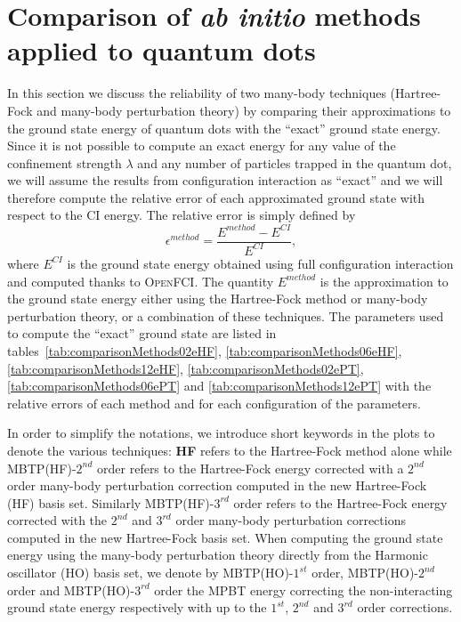 \section{Comparison of \textit{ab initio} methods applied to quantum dots}
\label{sec:compTechniquesSection}
In this section we discuss the reliability of two many-body techniques (Hartree-Fock and many-body perturbation theory) by comparing their approximations to the ground state energy of quantum dots with the ``exact'' ground state energy. Since it is not possible to compute an exact energy for any value of the confinement strength $\lambda$ and any number of particles trapped in the quantum dot, we will assume the results from configuration interaction as ``exact'' and we will therefore compute the relative error of each approximated ground state with respect to the CI energy. The relative error is simply defined by
\begin{equation}
 \epsilon^{method}=\frac{E^{method}-E^{CI}}{E^{CI}},
\end{equation} 
where $E^{CI}$ is the ground state energy obtained using full configuration interaction and computed thanks to \textsc{OpenFCI}. The quantity $E^{method}$ is the approximation to the ground state energy either using the Hartree-Fock method or many-body perturbation theory, or a combination of these techniques. The parameters used to compute the ``exact'' ground state are listed in tables~\ref{tab:comparisonMethods02eHF}, \ref{tab:comparisonMethods06eHF}, \ref{tab:comparisonMethods12eHF}, \ref{tab:comparisonMethods02ePT}, \ref{tab:comparisonMethods06ePT} and \ref{tab:comparisonMethods12ePT} with the relative errors of each method and for each configuration of the parameters.

In order to simplify the notations, we introduce short keywords in the plots to denote the various techniques: \textbf{HF} refers to the Hartree-Fock method alone while MBTP(HF)-$2^{nd}$ order refers to the Hartree-Fock energy corrected with a $2^{nd}$ order many-body perturbation correction computed in the new Hartree-Fock (HF) basis set. Similarly MBTP(HF)-$3^{rd}$ order refers to the Hartree-Fock energy corrected with the $2^{nd}$ and $3^{rd}$ order many-body perturbation corrections computed in the new Hartree-Fock basis set.
When computing the ground state energy using the many-body perturbation theory directly from the Harmonic oscillator (HO) basis set, we denote by MBTP(HO)-$1^{st}$ order, MBTP(HO)-$2^{nd}$ order and MBTP(HO)-$3^{rd}$ order the MPBT energy correcting the non-interacting ground state energy respectively with up to the $1^{st}$, $2^{nd}$ and $3^{rd}$ order corrections.


